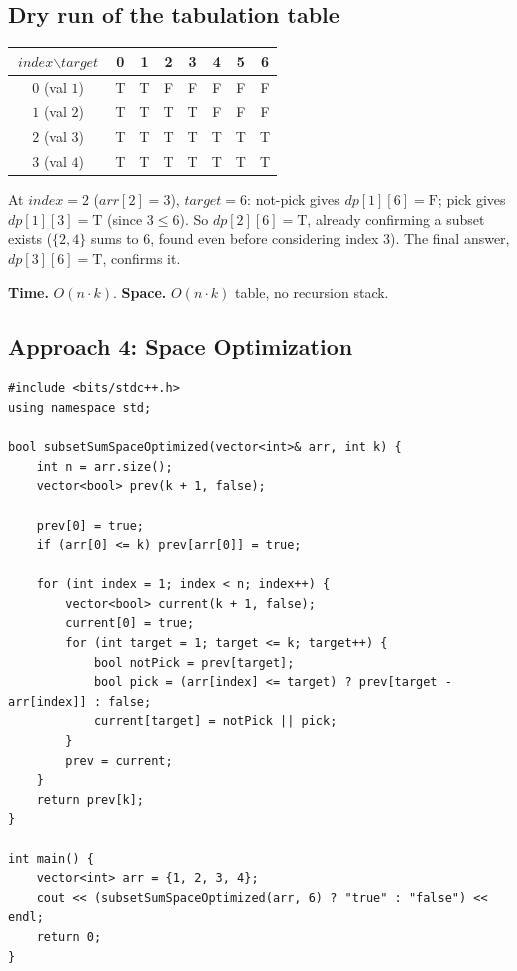\subsection*{Dry run of the tabulation table}


\begin{center}
\begin{tabular}{c|ccccccc}
$\textit{index}\backslash\textit{target}$ & 0 & 1 & 2 & 3 & 4 & 5 & 6 \\ \hline
$0$ (val $1$) & T & T & F & F & F & F & F \\
$1$ (val $2$) & T & T & T & T & F & F & F \\
$2$ (val $3$) & T & T & T & T & T & T & T \\
$3$ (val $4$) & T & T & T & T & T & T & T
\end{tabular}
\end{center}

At $\textit{index}=2$ ($\textit{arr}[2]=3$), $\textit{target}=6$:
not-pick gives $\textit{dp}[1][6]=\text{F}$; pick gives
$\textit{dp}[1][3]=\text{T}$ (since $3\le6$). So
$\textit{dp}[2][6]=\text{T}$, already confirming a subset exists
($\{2,4\}$ sums to $6$, found even before considering index $3$). The
final answer, $\textit{dp}[3][6]=\text{T}$, confirms it.

\begin{complexitybox}
\textbf{Time.} $O(n \cdot k)$.
\textbf{Space.} $O(n \cdot k)$ table, no recursion stack.
\end{complexitybox}

\subsection*{Approach 4: Space Optimization}

\begin{lstlisting}
#include <bits/stdc++.h>
using namespace std;

bool subsetSumSpaceOptimized(vector<int>& arr, int k) {
    int n = arr.size();
    vector<bool> prev(k + 1, false);

    prev[0] = true;
    if (arr[0] <= k) prev[arr[0]] = true;

    for (int index = 1; index < n; index++) {
        vector<bool> current(k + 1, false);
        current[0] = true;
        for (int target = 1; target <= k; target++) {
            bool notPick = prev[target];
            bool pick = (arr[index] <= target) ? prev[target - arr[index]] : false;
            current[target] = notPick || pick;
        }
        prev = current;
    }
    return prev[k];
}

int main() {
    vector<int> arr = {1, 2, 3, 4};
    cout << (subsetSumSpaceOptimized(arr, 6) ? "true" : "false") << endl;
    return 0;
}
\end{lstlisting}

